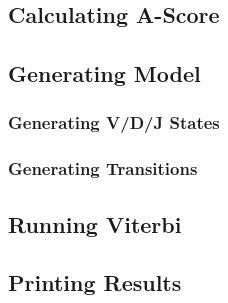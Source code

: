 \subsection{Calculating A-Score}
\subsection{Generating Model}
\subsubsection{Generating V/D/J States}
\subsubsection{Generating Transitions}
\subsection{Running Viterbi}
\subsection{Printing Results}


